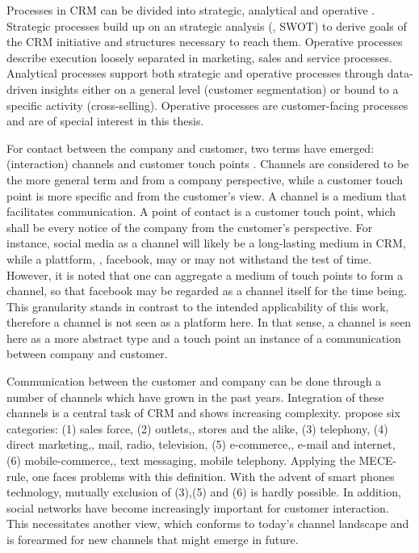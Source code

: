 		Processes in CRM can be divided into strategic, analytical and operative \cite{Neckel2005}. Strategic processes build up on an strategic analysis (\ie, SWOT) to derive goals of the CRM initiative and structures necessary to reach them. Operative processes describe execution loosely separated in marketing, sales and service processes. Analytical processes support both strategic and operative processes through data-driven insights either on a general level (\ie customer segmentation) or bound to a specific activity (\ie cross-selling). Operative processes are customer-facing processes and are of special interest in this thesis.
		
		 For contact between the company and customer, two terms have emerged: (interaction) channels and customer touch points \cite{Leuer2011}. Channels are considered to be the more general term and from a company perspective, while a customer touch point is more specific and from the customer's view. A channel is a medium that facilitates communication. A point of contact is a customer touch point, which shall be every notice of the company from the customer's perspective. For instance, social media as a channel will likely be a long-lasting medium in CRM, while a plattform, \ie, facebook, may or may not withstand the test of time. However, it is noted that one can aggregate a medium of touch points to form a channel, so that facebook may be regarded as a channel itself for the time being. This granularity stands in contrast to the intended applicability of this work, therefore a channel is  not seen as a platform here. 
		 In that sense, a channel is seen here as a more abstract type and a touch point an instance of a communication between company and customer. 
		
		Communication between the customer and company can be done through a number of channels which have grown in the past years. Integration of these channels is a central task of CRM and shows increasing complexity. \cite{paynefrow2005} propose six categories: (1) sales force, (2) outlets,\ie, stores and the alike, (3) telephony, (4) direct marketing,\ie, mail, radio, television, (5) e-commerce,\ie, e-mail and internet, (6) mobile-commerce,\ie, text messaging, mobile telephony. Applying the \acrfull{MECE}-rule, one faces problems with this definition. With the advent of smart phones technology, mutually exclusion of (3),(5) and (6) is hardly possible. In addition, social networks have become increasingly important for customer interaction. This necessitates another view, which conforms to today's channel landscape and is forearmed for new channels that might emerge in future. 
		
